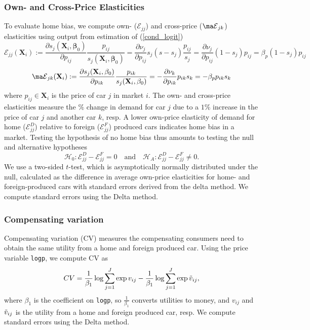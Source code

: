 \documentclass[11pt]{article}
\begin{document}
\subsubsection{Own- and Cross-Price Elasticities}
To evaluate home bias, we compute own- ($\mathbf{\mathcal{E}}_{jj}$) and cross-price ($\mathbf{\ma\mathcal{E}}_{jk}$) elasticities using output from estimation of (\ref{cond_logit})
\begin{equation}
\label{own_price_elasticity}
    \mathbf{\mathcal{E}}_{jj}(\mathbf{X}_i):=\frac{\partial s_j(\mathbf{X}_i,\mathbf{\beta}_0)}{\partial p_{ij}}\frac{p_{ij}}{s_j(\mathbf{X}_i,\mathbf{\beta}_0)} = \frac{\partial \nu_j}{\partial p_{ij}}s_j(s-s_j)\frac{p_{ij}}{s_j} = \frac{\partial \nu_j}{\partial p_{ij}}(1-s_j)p_{ij} = \beta_p (1-s_j)p_{ij}
\end{equation}
\begin{equation}
\label{cross_price_elasticity}
    \mathbf{\ma\mathcal{E}}_{jk}(\mathbf{X}_i):=\frac{\partial s_j(\mathbf{X}_i,\mathbf{\beta}_0)}{\partial p_{ik}}\frac{p_{ik}}{s_j(\mathbf{X}_i,\mathbf{\beta}_0)} = -\frac{\partial \nu_k}{\partial p_{ik}}p_{ik}s_k=-\beta_p p_{ik} s_k
\end{equation}
where $p_{ij}\in \mathbf{X}_i$ is the price of car $j$ in market $i$. 
The own- and cross-price elasticities measure the $\%$ change in demand for car $j$ due to a $1\%$ increase in the price of car $j$ and another car $k$, resp. 
A lower own-price elasticity of demand for home ($\mathbf{\mathcal{E}}_{jj}^{D}$) relative to foreign ($\mathbf{\mathcal{E}}_{jj}^{F}$) produced cars indicates home bias in a market. Testing the hypothesis of no home bias thus amounts to testing the null and alternative hypotheses
\begin{equation}
    \mathcal{H}_0: \mathbf{\mathcal{E}}_{jj}^{D}-\mathbf{\mathcal{E}}_{jj}^{F}=0 \quad \text{and} \quad \mathcal{H}_A: \mathbf{\mathcal{E}}_{jj}^{D}-\mathbf{\mathcal{E}}_{jj}^{F}\ne0.
\end{equation}
We use a two-sided $t$-test, which is asymptotically normally distributed under the null, calculated as the difference in average own-price elasticities for home- and foreign-produced cars with standard errors derived from the delta method. We compute standard errors using the Delta method.

\subsubsection{Compensating variation}
Compensating variation (CV) measures the compensating consumers need to obtain the same utility from a home and foreign produced car. Using the price variable \texttt{logp}, we compute CV as
\begin{equation}
    CV = \frac{1}{\beta_1} \log{\sum_{j=1}^J\exp{v_{ij}}} - \frac{1}{\beta_1} \log{\sum_{j=1}^J\exp{\Tilde{v}_{ij}}},
\end{equation}
where $\beta_1$ is the coefficient on \texttt{logp}, so $\frac{1}{\beta_1}$ converts utilities to money, and $v_{ij}$ and $\Tilde{v}_{ij}$ is the utility from a home and foreign produced car, resp. We compute standard errors using the Delta method.
\end{document}
